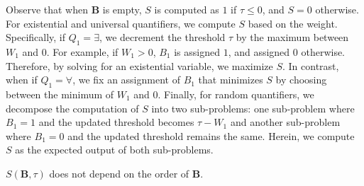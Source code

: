 
Observe that when $ \textbf{B} $ is empty, $S$ is computed as $ 1 $ if $ \tau \le 0 $, and  $ S = 0 $ otherwise. For  existential and universal quantifiers, we compute $ S $ based on the weight. Specifically, if $ Q_1 = \exists $, we decrement the threshold $ \tau $ by the maximum between $ W_1 $ and $ 0 $. For example, if $ W_1 > 0 $, $ B_1 $ is assigned $ 1 $, and assigned $ 0 $ otherwise. Therefore, by solving for an existential variable, we  maximize $ S $. In contrast, when if $ Q_1 = \forall $, we fix an assignment of $ B_1 $ that minimizes $ S $ by choosing between the minimum of $ W_1 $ and $ 0 $. Finally, for random quantifiers, we decompose the computation of $S$ into two sub-problems: one sub-problem where $ B_1 = 1 $ and the updated threshold becomes $ \tau - W_1 $ and another sub-problem where $ B_1 = 0 $ and the updated threshold remains the same. Herein, we compute $ S $ as the expected output of both sub-problems.

\begin{remark}
	\label{fvgm_lm:property_s3p}
	$ S(\mathbf{B},\tau) $ does not depend on the order of $ \mathbf{B} $.
\end{remark}

